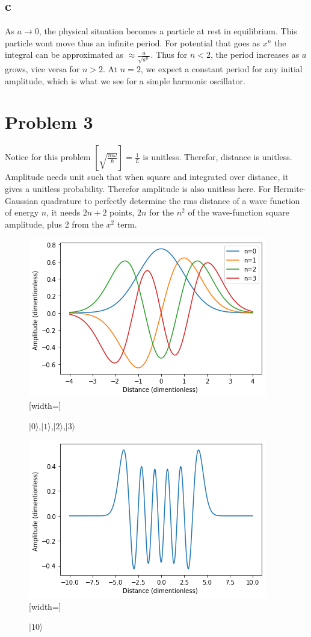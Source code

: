 \documentclass{article}
\begin{document}
\subsection{c}
As $a\rightarrow 0$, the physical situation becomes a particle at rest in equilibrium. This particle wont move thus an infinite period. For potential that goes as $x^n$ the integral can be approximated as $\approx \frac{a}{\sqrt{a^n}}$. Thus for $n<2$, the period increases as $a$ grows, vice versa for $n>2$. At $n=2$, we expect a constant period for any initial amplitude, which is what we see for a simple harmonic oscillator.
\section{Problem 3}
  
Notice for this problem $\left [\sqrt{\frac{m\omega}{\hbar}}   \right] = \frac{1}{L}$ is unitless. Therefor, distance is unitless. Amplitude needs unit such that when square and integrated over distance, it gives a unitless probability. Therefor amplitude is also unitless here.
For Hermite-Gaussian quadrature to perfectly determine the rms distance of a wave function of energy $n$, it needs $2n+2$ points, $2n$ for the $n^2$ of the wave-function square amplitude, plus 2 from the $x^2$ term.

\begin{figure}
    \centering
    \includegraphics{10.16a.png}[width=\textwidth]
    \caption{$|0\rangle$,$|1\rangle$,$|2\rangle$,$|3\rangle$}
    \label{fig:enter-label}
\end{figure}
\begin{figure}
    \centering
    \includegraphics{10.16b.png}[width=\textwidth]
    \caption{$|10\rangle$}
    \label{fig:enter-label}
\end{figure}
\end{document}

